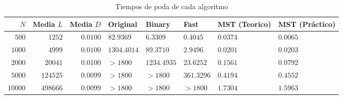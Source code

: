\documentclass[10pt,a4paper,spanish]{article}
\numberwithin{equation}{section} %
\numberwithin{figure}{section} %
\numberwithin{table}{section} %
\begin{document}
\begin{table}[!h]
\begin{tabular}{rrrlllll}
\hline
    $N$ &    Media $L$ &   Media $D$ & Original             & Binary               & Fast                 & MST (Teorico)          & MST (Práctico)         \\
\hline
$500$ &   $1252$ & $0.0100$  & $82.9369$  & $6.3309$  & $0.4045$ & $0.0374$ & $0.0065$ \\
$1000$ & $4999$ & $0.0100$   &       $1304.4014$ & $89.3710$  & $2.9496$ & $0.0201$  & $0.0203$ \\
$2000$ &  $20041$ & $0.0100$  &       $> 1800$ & $1234.4935$ & $23.6252$ & $0.1561$  & $0.0792$  \\
$5000$ & $124525$ & $0.0099$ & $> 1800$ & $> 1800$ & $361.3296$   & $0.4194$   & $0.4552$   \\
$10000$ & $498666$ & $0.0099$ & $> 1800$ & $> 1800$ & $> 1800$ & $1.7304$   & $1.5963$    \\
\hline
\end{tabular}


\caption{Tiempos de poda de cada algoritmo}
\label{tiempopoda}
\end{table}
\end{document}
